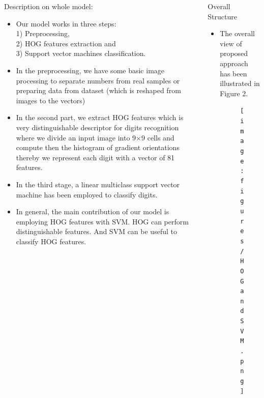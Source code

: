 \documentclass[8pt,final,hyperref={pdfpagelabels=false}]{beamer}
\theoremstyle{plain}
\begin{document}
\begin{frame}
\begin{columns}[t]
\begin{column}{.23\textwidth}
\begin{block}{Description on whole model:}
\begin{itemize}
            \item Our model works in three steps: \\ 1) Preprocessing, \\ 2) HOG features extraction and \\ 3) Support vector machines classification. \\ 
            \item In the preprocessing, we have some basic image processing to separate numbers from real samples or preparing data from dataset (which is reshaped from images to the vectors)
            
            \item In the second part, we extract HOG features which is very distinguishable descriptor for digits recognition where we divide an input image into 9×9 cells and compute then the histogram of gradient orientations thereby we represent each digit with a vector of 81 features. 
            
            \item In the third stage, a linear multiclass support vector machine has been employed to classify digits. 
             \item In general, the main contribution of our model is employing HOG features with SVM. HOG can perform distinguishable features. And SVM can be useful to classify HOG features.
        
        \end{itemize}
    \end{block}
    
\end{column} %

\begin{column}{.23\textwidth} %
    
        \begin{block}{Overall Structure}
        \begin{itemize}
        
            \item The overall view of proposed approach has been illustrated in Figure 2.
            \begin{figure}
                \texttt{[image: figures/HOG and SVM.png]}
            \end{figure}
            

\end{itemize}
\end{block}
\end{column}
\end{columns}
\end{frame}
\end{document}
